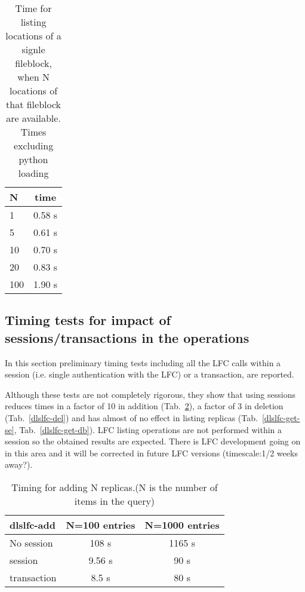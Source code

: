 \documentclass[pdftex]{cmspaper}
\begin{document}
\begin{table}[!htbp]
\begin{center}
 \begin{tabular}{|l|c|}         \hline
   N  & time \\ \hline
   1  & 0.58 s \\ \hline
   5  & 0.61 s  \\ \hline
   10 & 0.70 s \\ \hline
   20 & 0.83 s \\ \hline
  100 & 1.90 s \\ \hline
\end{tabular}
\caption {Time for listing locations of a signle fileblock, when N locations of that fileblock are available. Times excluding python loading}\label{get-se-1fileblock-test}
\end{center}
\end{table}

%  
%


\subsection {Timing tests for impact of sessions/transactions in the operations}

In this section preliminary timing tests including all the LFC calls within a session (i.e. single authentication with the LFC) or a transaction, are reported.

Although these tests are not completely rigorous, they show that using sessions reduces times in 
a factor of 10 in addition (Tab.~\ref{dlslfc-add}), a factor of 3 in deletion (Tab.~\ref{dlslfc-del}) and has almost of no effect in listing replicas (Tab.~\ref{dlslfc-get-se}, Tab.~\ref{dlslfc-get-db}).
LFC listing operations are not performed within a session so the obtained results are expected. There is LFC development going on in this area and it will be corrected in future LFC versions (timescale:1/2 weeks away?).


\begin{table}[!htbp]
\begin{center}
 \begin{tabular}{|l|c|c|}         \hline
   {\bf dlslfc-add}  & N=100 entries & N=1000 entries \\ \hline
 No session          & 108 s       & 1165 s \\ \hline
 session             & 9.56 s      & 90 s \\ \hline
 transaction         & 8.5 s      & 80 s \\ \hline        
\end{tabular}
\caption {Timing for adding N replicas.(N is the number of items in the query)}\label{dlslfc-add}
\end{center}
\end{table}
\end{document}
